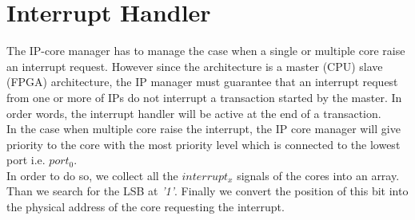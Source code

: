 \clearpage
\section{Interrupt Handler}
The IP-core manager has to manage the case when a single or multiple core raise an interrupt request. 
However since the architecture is a master (CPU) slave (FPGA) architecture, the IP manager must guarantee that an interrupt request from one or more of IPs do not interrupt a transaction started by the master. In order words, the interrupt handler will be active at the end of a transaction.\\
In the case when multiple core raise the interrupt, the IP core manager will give priority to the core with the most priority level which is connected to the lowest port i.e. $ port_0 $.\\
In order to do so, we collect all the $ interrupt_x $ signals of the cores into an array. Than we search for the LSB at \textit{'1'}. Finally we convert the position of this bit into the physical address of the core requesting the interrupt.\\

